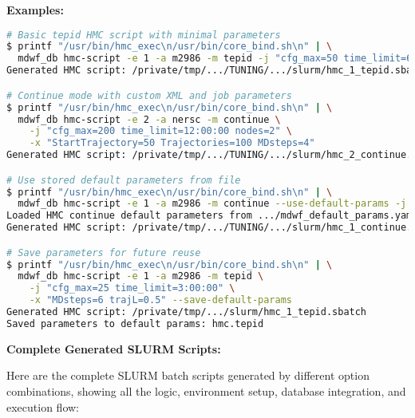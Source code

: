 \documentclass{article}
\begin{document}
\textbf{Examples:}
\begin{lstlisting}[language=bash]
# Basic tepid HMC script with minimal parameters
$ printf "/usr/bin/hmc_exec\n/usr/bin/core_bind.sh\n" | \
  mdwf_db hmc-script -e 1 -a m2986 -m tepid -j "cfg_max=50 time_limit=6:00:00"
Generated HMC script: /private/tmp/.../TUNING/.../slurm/hmc_1_tepid.sbatch

# Continue mode with custom XML and job parameters  
$ printf "/usr/bin/hmc_exec\n/usr/bin/core_bind.sh\n" | \
  mdwf_db hmc-script -e 2 -a nersc -m continue \
    -j "cfg_max=200 time_limit=12:00:00 nodes=2" \
    -x "StartTrajectory=50 Trajectories=100 MDsteps=4"
Generated HMC script: /private/tmp/.../TUNING/.../slurm/hmc_2_continue.sbatch

# Use stored default parameters from file
$ printf "/usr/bin/hmc_exec\n/usr/bin/core_bind.sh\n" | \
  mdwf_db hmc-script -e 1 -a m2986 -m continue --use-default-params -j "nodes=2"
Loaded HMC continue default parameters from .../mdwf_default_params.yaml
Generated HMC script: /private/tmp/.../TUNING/.../slurm/hmc_1_continue.sbatch

# Save parameters for future reuse
$ printf "/usr/bin/hmc_exec\n/usr/bin/core_bind.sh\n" | \
  mdwf_db hmc-script -e 1 -a m2986 -m tepid \
    -j "cfg_max=25 time_limit=3:00:00" \
    -x "MDsteps=6 trajL=0.5" --save-default-params
Generated HMC script: /private/tmp/.../slurm/hmc_1_tepid.sbatch
Saved parameters to default params: hmc.tepid
\end{lstlisting}

\textbf{Complete Generated SLURM Scripts:}

Here are the complete SLURM batch scripts generated by different option combinations, showing all the logic, environment setup, database integration, and execution flow:
\end{document}
